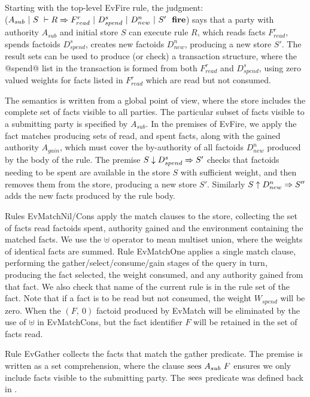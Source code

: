 Starting with the top-level EvFire rule, the judgment: \\
($A_{sub}~|~S~\vdash R \Rightarrow F^r_{read}~|~D^s_{spend}~|~D^n_{new}~|~S'~~\textbf{fire}$) says that a party with authority $A_{sub}$ and initial store $S$ can execute rule $R$, which reads facts $F^r_{read}$, spends factoids $D^s_{spend}$, creates new factoids $D^n_{new}$, producing a new store $S'$. The result sets can be used to produce (or check) a transaction structure, where the @spend@ list in the transaction is formed from both $F^r_{read}$ and $D^s_{spend}$, using zero valued weights for facts listed in $F^r_{read}$ which are read but not consumed.

The semantics is written from a global point of view, where the store includes the complete set of facts visible to all parties. The particular subset of facts visible to a submitting party is specified by $A_{sub}$. In the premises of EvFire, we apply the fact matches producing sets of read, and spent facts, along with the gained authority $A_{gain}$, which must cover the by-authority of all factoids $D^n_{new}$ produced by the body of the rule. The premise $S \downarrow D^s_{spend} \Rightarrow S'$ checks that factoids needing to be spent are available in the store $S$ with sufficient weight, and then removes them from the store, producing a new store $S'$. Similarly $S \uparrow D^n_{new} \Rightarrow S''$ adds the new facts produced by the rule body.

Rules EvMatchNil/Cons apply the match clauses to the store, collecting the set of facts read factoids spent, authority gained and the environment containing the matched facts. We use the $\uplus$ operator to mean multiset union, where the weights of identical facts are summed. Rule EvMatchOne applies a single match clause, performing the gather/select/consume/gain stages of the query in turn, producing the fact selected, the weight consumed, and any authority gained from that fact. We also check that name of the current rule is in the rule set of the fact. Note that if a fact is to be read but not consumed, the weight $W_{spend}$ will be zero. When the $(F,~ 0)$ factoid produced by EvMatch will be eliminated by the use of $\uplus$ in EvMatchCons, but the fact identifier $F$ will be retained in the set of facts read.

Rule EvGather collects the facts that match the gather predicate. The premise is written as a set comprehension, where the clause $\textrm{sees}~ A_{sub}~ F$ ensures we only include facts visible to the submitting party. The $\textrm{sees}$ predicate was defined back in \REF.

